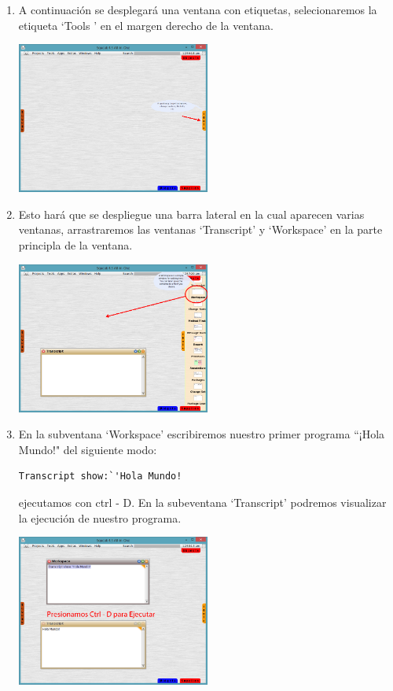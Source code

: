 \documentclass[11pt]{article}
\begin{document}
\begin{enumerate}
\item
A continuación se desplegará una ventana con etiquetas, selecionaremos la etiqueta `Tools ' en el margen derecho de la ventana.
				\begin{center}
				\includegraphics[width=0.5\textwidth]{images/tools}
				\end{center}
\item
Esto hará que se despliegue una barra lateral en la cual aparecen varias ventanas, arrastraremos las ventanas `Transcript' y `Workspace' en la parte principla de la ventana.
				\begin{center}
				\includegraphics[width=0.5\textwidth]{images/drag_tools}
				\end{center}
\item
En la subventana `Workspace' escribiremos nuestro primer programa ``¡Hola Mundo!" del siguiente modo:
\begin{lstlisting}
Transcript show:`'Hola Mundo! 
\end{lstlisting}
ejecutamos con ctrl - D. En la subeventana `Transcript' podremos visualizar la ejecución de nuestro programa.
				\begin{center}
				\includegraphics[width=0.5\textwidth]{images/executing}
				\end{center}


\end{enumerate}
\end{document}

